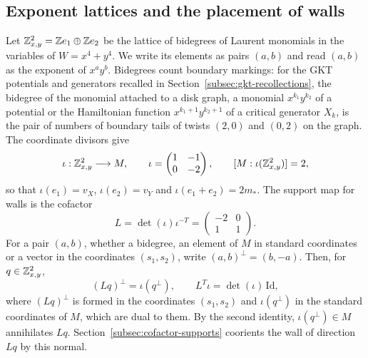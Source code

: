\subsection{Exponent lattices and the placement of walls}
\label{subsec:exponent-lattices}

Let $\mathbb Z^2_{x,y}=\mathbb Z e_1\oplus\mathbb Z e_2$ be the lattice of bidegrees of Laurent
monomials in the variables of $W=x^4+y^4$.  We write its elements as pairs
$(a,b)$ and read $(a,b)$ as the exponent of $x^ay^b$.  Bidegrees count
boundary markings: for the GKT potentials and generators recalled in
Section~\ref{subsec:gkt-recollections}, the bidegree of the monomial attached
to a disk graph, a monomial $x^{k_1}y^{k_2}$ of a potential or the
Hamiltonian function $x^{k_1+1}y^{k_2+1}$ of a critical generator $X_k$, is
the pair
of numbers of boundary tails of twists $(2,0)$ and $(0,2)$ on the graph.  The
coordinate divisors give
\begin{equation}\label{eq:iota}
 \iota:\mathbb Z^2_{x,y}\longrightarrow M,
 \qquad
 \iota=\begin{pmatrix}1&-1\\0&-2\end{pmatrix},
 \qquad [M:\iota(\mathbb Z^2_{x,y})]=2,
\end{equation}
so that $\iota(e_1)=v_X$, $\iota(e_2)=v_Y$ and $\iota(e_1+e_2)=2m_*$.  The
support map for walls is the cofactor
\begin{equation}\label{eq:cofactor}
 L=\det(\iota)\iota^{-T}
  =\begin{pmatrix}-2&0\\1&1\end{pmatrix}.
\end{equation}
For a pair $(a,b)$, whether a bidegree, an element of $M$ in standard
coordinates or a vector in the coordinates $(s_1,s_2)$, write
$(a,b)^\perp=(b,-a)$.  Then, for $q\in\mathbb Z^2_{x,y}$,
\begin{equation}\label{eq:cofactor-identity}
 (Lq)^\perp=\iota(q^\perp),
 \qquad L^T\iota=\det(\iota)\,\mathrm{Id},
\end{equation}
where $(Lq)^\perp$ is formed in the coordinates $(s_1,s_2)$ and
$\iota(q^\perp)$ in the standard coordinates of $M$, which are dual to them.
By the second identity, $\iota(q^\perp)\in M$ annihilates $Lq$.
Section~\ref{subsec:cofactor-supports} coorients the wall of direction $Lq$
by this normal.

